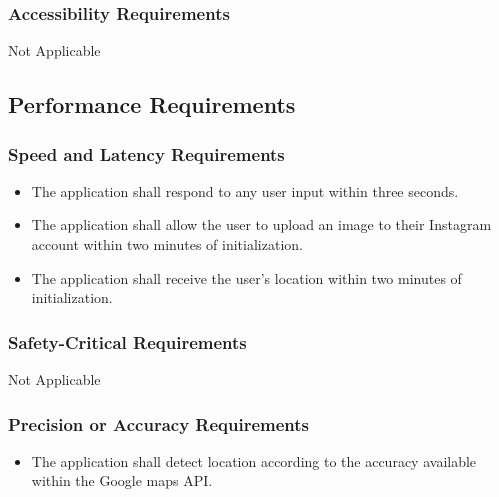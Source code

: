 \documentclass[]{article}
\begin{document}
\subsubsection{Accessibility Requirements}
\label{ssub:accessibility_requirements}
	Not Applicable


\subsection{Performance Requirements}
\label{sub:performance_requirements}

\subsubsection{Speed and Latency Requirements}
\label{ssub:speed_and_latency_requirements}
\begin{itemize}
	\item The application shall respond to any user input within three seconds.
	\item The application shall allow the user to upload an image to their Instagram account within two minutes of initialization.
	\item The application shall receive the user's location within two minutes of initialization.
\end{itemize}

\subsubsection{Safety-Critical Requirements}
\label{ssub:safety_critical_requirements}
Not Applicable

\subsubsection{Precision or Accuracy Requirements}
\label{ssub:precision_or_accuracy_requirements}
\begin{itemize}
	\item The application shall detect location according to the accuracy available within the Google maps API.
\end{itemize}
\end{document}
